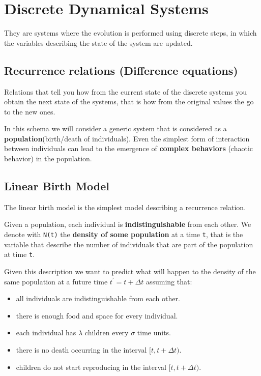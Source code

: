 \chapter{Discrete Dynamical Systems}
They are systems where the evolution is performed using discrete steps, in which the variables describing the state of the system are updated.

\section{Recurrence relations (Difference equations)}
Relations that tell you how from the current state of the discrete systems you obtain the next state of the systems, that is how from the original values the go to the new ones.
\par In this schema we will consider a generic system that is considered as a \textbf{population}(birth/death of individuals). Even the simplest form of interaction between individuals can lead to the emergence of \textbf{complex behaviors} (chaotic behavior) in the population. 

\section{Linear Birth Model}
The linear birth model is the simplest model describing a recurrence relation.
\par Given a population, each individual is \textbf{indistinguishable} from each other. We denote with \texttt{N(t)} the \textbf{density of some population} at a time \texttt{t}, that is the variable that describe the number of individuals that are part of the population at time \texttt{t}.
\par Given this description we want to predict what will happen to the density of the same population at a future time $t^{'} = t + \Delta{t}$ assuming that:

\begin{itemize}
    \item all individuals are indistinguishable from each other.
    
    \item there is enough food and space for every individual.
    
    \item each individual has $\lambda$ children every $\sigma$ time units.

    \item there is no death occurring in the interval $ [t, t + \Delta{t} )$.

    \item children do not start reproducing in the interval $ [t, t + \Delta{t} )$.
\end{itemize}

